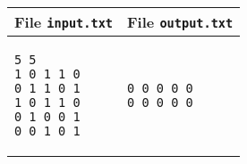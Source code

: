 \documentclass[a4paper,11pt]{article}
\begin{document}
    \noindent
    \begin{tabular}{p{11cm}|p{5cm}}
    \toprule
    \textbf{File \texttt{input.txt}}
    & \textbf{File \texttt{output.txt}}
    \\
    \midrule
    \scriptsize
    \begin{verbatim}
5 5
1 0 1 1 0
0 1 1 0 1
1 0 1 1 0
0 1 0 0 1
0 0 1 0 1
\end{verbatim}
    &
    \scriptsize
    \begin{verbatim}
0 0 0 0 0
0 0 0 0 0
\end{verbatim}
    \\
    \bottomrule
    \end{tabular}
  
\end{document}
